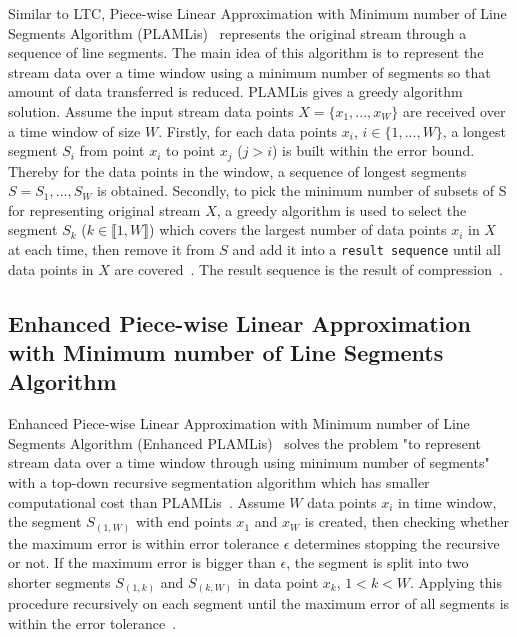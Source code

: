 Similar to LTC, Piece-wise Linear Approximation with Minimum number of Line
Segments Algorithm (PLAMLis)~\cite{liu2007energy} represents the original stream
through a sequence of line segments. The main idea of this algorithm is to
represent the stream data over a time window using a minimum number of segments
so that amount of data transferred is reduced. PLAMLis gives a greedy algorithm
solution. Assume the input stream data points $X=\{x_1, ..., x_W\}$ are received
over a time window of size $W$. Firstly, for each data points $x_i$, $i \in
\{1, ..., W\}$, a longest segment $S_{i}$ from point $x_i$ to point $x_j$
($j>i$) is built within the error bound. Thereby for the data points in the
window, a sequence of longest segments $S = {S_1, ..., S_W}$ is obtained.
Secondly, to pick the minimum number of subsets of S for representing original
stream $X$, a greedy algorithm is used to select the segment $S_k$ ($k \in
\llbracket1, W\rrbracket$) which covers the largest number of data points $x_i$
in $X$ at each time, then remove it from $S$ and add it into a \texttt{result
sequence} until all data points in $X$ are covered~\cite{liu2007energy}. The
result sequence is the result of compression~\cite{zordan2012compress,
zordan2014performance}.


\subsection{Enhanced Piece-wise Linear Approximation with Minimum number of Line
Segments Algorithm}

Enhanced Piece-wise Linear Approximation with Minimum number of Line Segments
Algorithm (Enhanced PLAMLis)~\cite{pham2008enhance} solves the problem "to
represent stream data over a time window through using minimum number of
segments" with a top-down recursive segmentation algorithm which has smaller
computational cost than PLAMLis~\cite{pham2008enhance, zordan2014performance}.
Assume $W$ data points $x_i$ in time window, the segment $S_{(1, W)}$ with end
points $x_1$ and $x_W$ is created, then checking whether the maximum error is
within error tolerance $\epsilon$ determines stopping the recursive or not. If
the maximum error is bigger than $\epsilon$, the segment is split into two
shorter segments $S_{(1, k)}$ and $S_{(k, W)}$ in data point $x_k$, $1<k<W$.
Applying this procedure recursively on each segment until the maximum error of
all segments is within the error tolerance~\cite{pham2008enhance,
zordan2014performance}.


